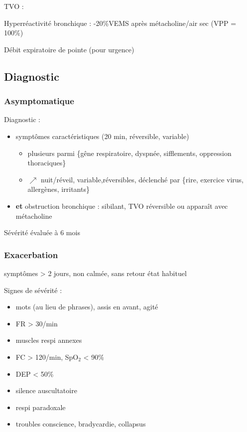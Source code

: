 \documentclass{book}
\begin{document}
TVO : 



Hyperréactivité bronchique : -20\%VEMS après métacholine/air sec (VPP = 100\%)

Débit expiratoire de pointe (pour urgence)

\subsection{Diagnostic}
\label{sec:orgae8b77d}
\subsubsection{Asymptomatique}
\label{sec:orgf33af7b}
Diagnostic :

\begin{itemize}
\item symptômes caractéristiques (20 min, réversible, variable)

\begin{itemize}
\item plusieurs parmi \{gêne respiratoire, dyspnée,
sifflements, oppression thoraciques\}
\item \(\nearrow\) nuit/réveil, variable,réversibles, déclenché par \{rire, exercice
virus, allergènes, irritants\}
\end{itemize}

\item \textbf{et} obstruction bronchique : sibilant, TVO réversible ou apparaît avec métacholine
\end{itemize}

Sévérité évaluée à 6 mois
\subsubsection{Exacerbation}
\label{sec:org819c845}
\nearrow{} symptômes > 2 jours, non calmée, sans retour état habituel

Signes de sévérité :

\begin{itemize}
\item mots (au lieu de phrases), assis en avant, agité
\item FR > 30/min
\item muscles respi annexes
\item FC > 120/min, SpO\(_{\text{2}}\) < 90\%
\item DEP < 50\%
\item silence auscultatoire \faBomb
\item respi paradoxale \faBomb
\item troubles conscience, bradycardie, collapsus \faBomb
\end{itemize}
\end{document}
